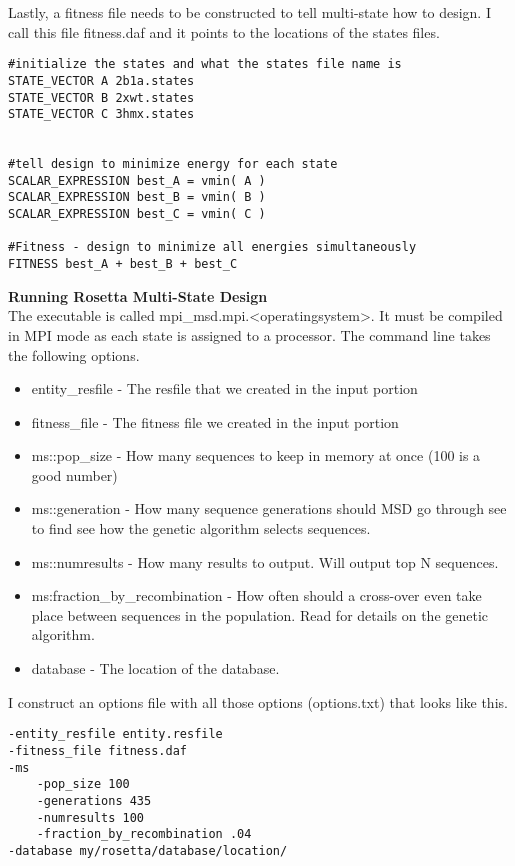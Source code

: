 Lastly, a fitness file needs to be constructed to tell multi-state how to design. I call this file fitness.daf and it points to the locations of the states files.

\begin{lstlisting}[breaklines=true]
#initialize the states and what the states file name is
STATE_VECTOR A 2b1a.states
STATE_VECTOR B 2xwt.states
STATE_VECTOR C 3hmx.states


#tell design to minimize energy for each state
SCALAR_EXPRESSION best_A = vmin( A )
SCALAR_EXPRESSION best_B = vmin( B )
SCALAR_EXPRESSION best_C = vmin( C )

#Fitness - design to minimize all energies simultaneously
FITNESS best_A + best_B + best_C
\end{lstlisting}

\textbf{Running Rosetta Multi-State Design} \\
The \rosetta executable is called mpi\_msd.mpi.<operatingsystem>. It must be compiled in MPI mode as each state is assigned to a processor. The command line takes the following options.

\begin{itemize}
\item entity\_resfile - The resfile that we created in the input portion
\item fitness\_file - The fitness file we created in the input portion
\item ms::pop\_size - How many sequences to keep in memory at once (100 is a good number)
\item ms::generation - How many sequence generations should MSD go through see \citep{LeaverFay:2011ji} to find see how the genetic algorithm selects sequences.
\item ms::numresults - How many results to output. Will output top N sequences.
\item ms:fraction\_by\_recombination - How often should a cross-over even take place between sequences in the population. Read \citep{LeaverFay:2011ji} for details on the genetic algorithm.
\item database - The location of the database.
\end{itemize}

I construct an options file with all those options (options.txt) that looks like this.

\begin{lstlisting}[breaklines=true]
-entity_resfile entity.resfile
-fitness_file fitness.daf
-ms
    -pop_size 100
    -generations 435
    -numresults 100
    -fraction_by_recombination .04
-database my/rosetta/database/location/
\end{lstlisting}

